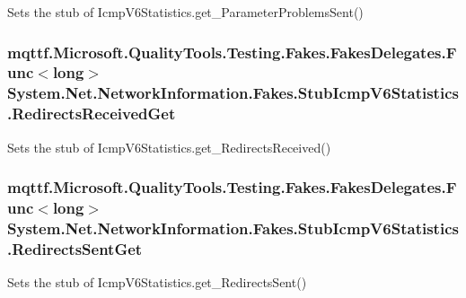 Sets the stub of Icmp\-V6\-Statistics.\-get\-\_\-\-Parameter\-Problems\-Sent()

\hypertarget{class_system_1_1_net_1_1_network_information_1_1_fakes_1_1_stub_icmp_v6_statistics_a7f1c6dfd780793033afceafcab71fa0a}{
\subsubsection[{Redirects\-Received\-Get}]{\setlength{\rightskip}{0pt plus 5cm}mqttf.\-Microsoft.\-Quality\-Tools.\-Testing.\-Fakes.\-Fakes\-Delegates.\-Func$<$long$>$ System.\-Net.\-Network\-Information.\-Fakes.\-Stub\-Icmp\-V6\-Statistics.\-Redirects\-Received\-Get}}\label{class_system_1_1_net_1_1_network_information_1_1_fakes_1_1_stub_icmp_v6_statistics_a7f1c6dfd780793033afceafcab71fa0a}


Sets the stub of Icmp\-V6\-Statistics.\-get\-\_\-\-Redirects\-Received()

\hypertarget{class_system_1_1_net_1_1_network_information_1_1_fakes_1_1_stub_icmp_v6_statistics_a82d8bd252b46627eafde5636e1d5c8e3}{
\subsubsection[{Redirects\-Sent\-Get}]{\setlength{\rightskip}{0pt plus 5cm}mqttf.\-Microsoft.\-Quality\-Tools.\-Testing.\-Fakes.\-Fakes\-Delegates.\-Func$<$long$>$ System.\-Net.\-Network\-Information.\-Fakes.\-Stub\-Icmp\-V6\-Statistics.\-Redirects\-Sent\-Get}}\label{class_system_1_1_net_1_1_network_information_1_1_fakes_1_1_stub_icmp_v6_statistics_a82d8bd252b46627eafde5636e1d5c8e3}


Sets the stub of Icmp\-V6\-Statistics.\-get\-\_\-\-Redirects\-Sent()

